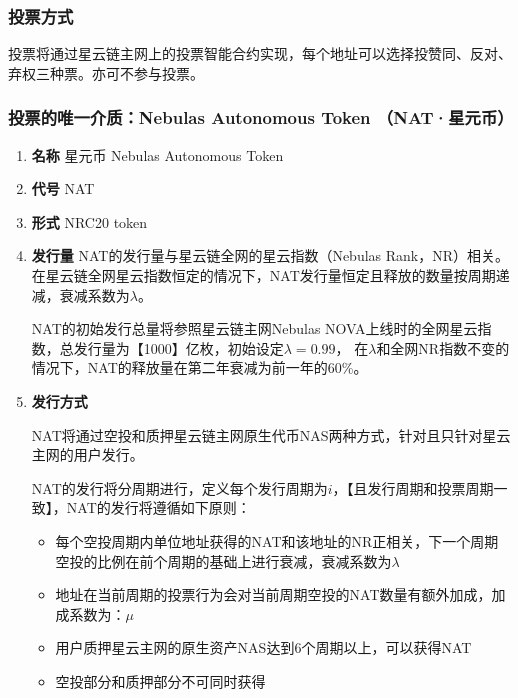 \subsubsection{投票方式}

投票将通过星云链主网上的投票智能合约实现，每个地址可以选择投赞同、反对、弃权三种票。亦可不参与投票。

\subsubsection{投票的唯一介质：Nebulas Autonomous Token （NAT·星元币）}

\begin{enumerate}
	\item \textbf{名称}
		星元币 Nebulas Autonomous Token
		
	\item \textbf{代号}
	NAT

	\item  \textbf{形式}
	NRC20 token

	\item \textbf{发行量}
	NAT的发行量与星云链全网的星云指数（Nebulas Rank，NR）相关。在星云链全网星云指数恒定的情况下，NAT发行量恒定且释放的数量按周期递减，衰减系数为$\lambda$。
	
	NAT的初始发行总量将参照星云链主网Nebulas NOVA上线时的全网星云指数，总发行量为【1000】亿枚，初始设定$\lambda=0.99$， 在$\lambda$和全网NR指数不变的情况下，NAT的释放量在第二年衰减为前一年的60\%。  


	\item \textbf{发行方式}
	
	NAT将通过空投和质押星云链主网原生代币NAS两种方式，针对且只针对星云主网的用户发行。
	
	NAT的发行将分周期进行，定义每个发行周期为$i$，【且发行周期和投票周期一致】，NAT的发行将遵循如下原则：

		\begin{itemize}
			\item 每个空投周期内单位地址获得的NAT和该地址的NR正相关，下一个周期空投的比例在前个周期的基础上进行衰减，衰减系数为$\lambda$
			\item 地址在当前周期的投票行为会对当前周期空投的NAT数量有额外加成，加成系数为：$\mu$
			\item 用户质押星云主网的原生资产NAS达到6个周期以上，可以获得NAT
			\item 空投部分和质押部分不可同时获得
		\end{itemize}
\end{enumerate}

